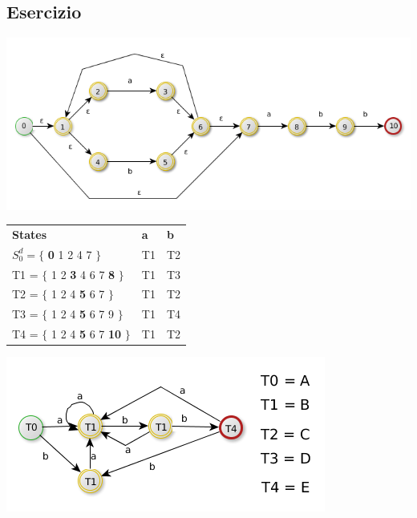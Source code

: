 \subsection{Esercizio}
\begin{center}
	\includegraphics[scale=0.5]{Chapters/Img/c02_03.png}\\
\end{center} 

\begin{tabular}{lll}
    \textbf{States}                                 &   \textbf{a}        &     \textbf{b} \\
    $S_0^d = \{$ \textbf{0} 1 2 4 7 $\}$            &   T1                &     T2 \\
    T1 = $\{$ 1 2 \textbf{3} 4 6 7 \textbf{8} $\}$  &   T1                &     T3 \\
    T2 = $\{$ 1 2 4 \textbf{5} 6 7 $\}$             &   T1                &     T2 \\
    T3 = $\{$ 1 2 4 \textbf{5} 6 7 9 $\}$           &   T1                &     T4 \\
    T4 = $\{$ 1 2 4 \textbf{5} 6 7 \textbf{10} $\}$ &   T1                &     T2 \\
\end{tabular}

\begin{center}
	\includegraphics[scale=0.5]{Chapters/Img/c02_04.png}\\
\end{center} 


